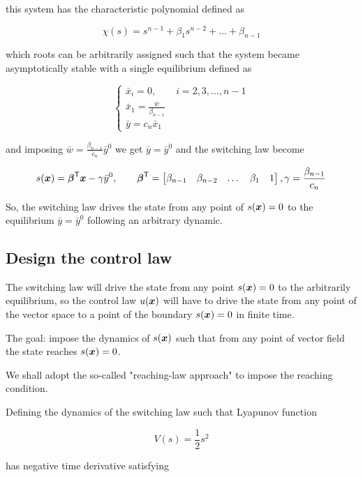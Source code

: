 this system has the characteristic polynomial defined as

\[
    \chi(s) = s^{n-1} + \beta_1 s^{n-2} + \dots + \beta_{n-1}
\]

which roots can be arbitrarily assigned such that the system became asymptotically stable with a single equilibrium defined as

\[
    \begin{cases}
        \bar x_i = 0, \qquad i = 2,3,\dots, n-1 \\
        \bar x_1 = \frac{\bar w}{\beta_{n-1}} \\
        \bar y = c_n \bar x_1
    \end{cases}
\]

and imposing $\bar w = \frac{\beta_{n-1}}{c_n} \bar y^0$ we get $\bar y = \bar y^0$ and the switching law become

\begin{equation}
    s(\boldsymbol{x}) = \boldsymbol{\beta}^{\mathsf{T}} \boldsymbol{x} - \gamma \bar y^0, \qquad
    \boldsymbol{\beta}^{\mathsf{T}} = \begin{bmatrix} \beta_{n-1} & \beta_{n-2} & \dots & \beta_1 & 1 \end{bmatrix},
    \gamma = \frac{\beta_{n-1}}{c_n}
    \label{eqn:switching-law}
\end{equation}

So, the switching law drives the state from any point of $s(\boldsymbol{x})=0$ to the equilibrium $\bar y = \bar y^0$ following an arbitrary dynamic.

\subsection{Design the control law}

The switching law will drive the state from any point $s(\boldsymbol{x}) = 0$ to the arbitrarily equilibrium, so the control law $u(\boldsymbol{x})$ will have to drive the state from any point of the vector space to a point of the boundary $s(\boldsymbol{x}) = 0$ in finite time.

The goal: impose the dynamics of $s(\boldsymbol{x})$ such that from any point of vector field the state reaches $s(\boldsymbol{x}) = 0$.

We shall adopt the so-called "reaching-law approach" to impose the reaching condition.

Defining the dynamics of the switching law such that Lyapunov function

\[
    V(s) = \frac{1}{2} s^2
\]

has negative time derivative satisfying

